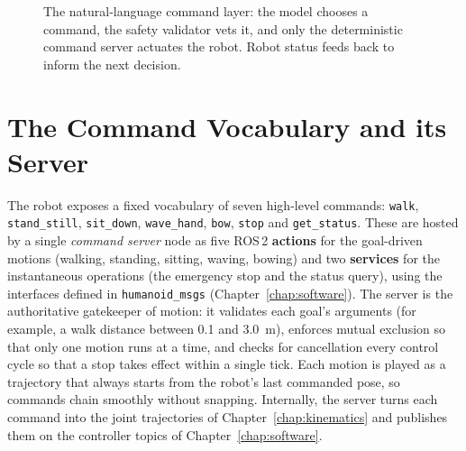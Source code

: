 \begin{figure}[ht]
  \centering
  \caption{The natural-language command layer: the model chooses a command,
           the safety validator vets it, and only the deterministic command
           server actuates the robot. Robot status feeds back to inform the
           next decision.}
  \label{fig:aiflow}
\end{figure}

\section{The Command Vocabulary and its Server}
\label{sec:ai-vocab}
The robot exposes a fixed vocabulary of seven high-level commands:
\texttt{walk}, \texttt{stand\_still}, \texttt{sit\_down},
\texttt{wave\_hand}, \texttt{bow}, \texttt{stop} and \texttt{get\_status}.
These are hosted by a single \emph{command server} node as five ROS\,2
\textbf{actions} for the goal-driven motions (walking, standing, sitting,
waving, bowing) and two \textbf{services} for the instantaneous operations
(the emergency stop and the status query), using the interfaces defined in
\texttt{humanoid\_msgs} (Chapter~\ref{chap:software}). The server is the
authoritative gatekeeper of motion: it validates each goal's arguments
(for example, a walk distance between 0.1 and 3.0~m), enforces mutual
exclusion so that only one motion runs at a time, and checks for
cancellation every control cycle so that a stop takes effect within a
single tick. Each motion is played as a trajectory that always starts from
the robot's last commanded pose, so commands chain smoothly without
snapping. Internally, the server turns each command into the joint
trajectories of Chapter~\ref{chap:kinematics} and publishes them on the
controller topics of Chapter~\ref{chap:software}.

